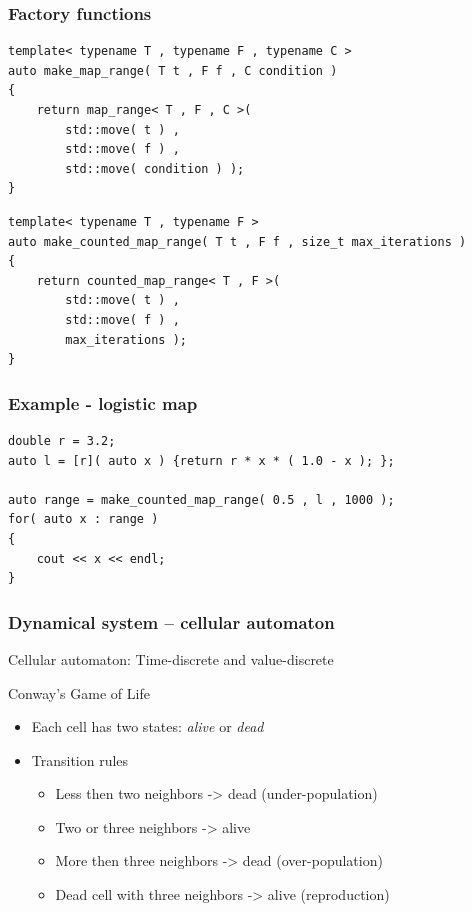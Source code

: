 \documentclass{beamer}
\newcommand{\heading}[1]{\frametitle{#1}}
\begin{document}
\begin{frame}[fragile]
 \heading{Factory functions}
 
\begin{lstlisting}[basicstyle=\scriptsize\ttfamily]
template< typename T , typename F , typename C >
auto make_map_range( T t , F f , C condition )
{
    return map_range< T , F , C >(
        std::move( t ) ,
        std::move( f ) ,
        std::move( condition ) );
}
\end{lstlisting}

\begin{lstlisting}[basicstyle=\scriptsize\ttfamily]
template< typename T , typename F >
auto make_counted_map_range( T t , F f , size_t max_iterations )
{
    return counted_map_range< T , F >(
        std::move( t ) ,
        std::move( f ) , 
        max_iterations );
}
\end{lstlisting}

\end{frame}


\begin{frame}[fragile]

  \heading{Example - logistic map}

\begin{lstlisting}[basicstyle=\scriptsize\ttfamily]
double r = 3.2;
auto l = [r]( auto x ) {return r * x * ( 1.0 - x ); };

auto range = make_counted_map_range( 0.5 , l , 1000 );
for( auto x : range )
{
    cout << x << endl;
}
\end{lstlisting}

\end{frame}




\begin{frame}[fragile]
 \heading{Dynamical system -- cellular automaton}
 
 Cellular automaton: Time-discrete and value-discrete
 
 \vspace{2ex}
 Conway's Game of Life
 
 \begin{itemize}
  \item Each cell has two states: {\it alive} or {\it dead}
  \item Transition rules
  \begin{itemize}
    \item Less then two neighbors -> dead (under-population)
    \item Two or three neighbors -> alive 
    \item More then three neighbors -> dead (over-population)
    \item Dead cell with three neighbors -> alive (reproduction)
  \end{itemize}
 \end{itemize}

\end{frame}
\end{document}
